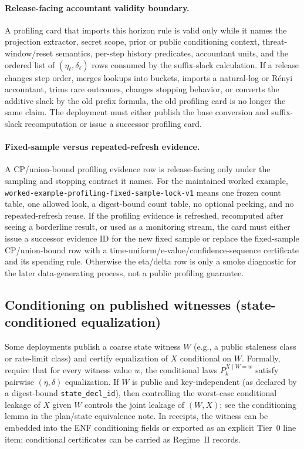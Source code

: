 \documentclass[11pt]{article}
\begin{document}
\paragraph{Release-facing accountant validity boundary.}
A profiling card that imports this horizon rule is valid only while it names the projection extractor, secret scope, prior or public conditioning context, threat-window/reset semantics, per-step history predicates, accountant units, and the ordered list of $(\eta_\ell,\delta_\ell)$ rows consumed by the suffix-slack calculation.
If a release changes step order, merges lookups into buckets, imports a natural-log or R\'enyi accountant, trims rare outcomes, changes stopping behavior, or converts the additive slack by the old prefix formula, the old profiling card is no longer the same claim.
The deployment must either publish the base conversion and suffix-slack recomputation or issue a successor profiling card.

\paragraph{Fixed-sample versus repeated-refresh evidence.}
A CP/union-bound profiling evidence row is release-facing only under the sampling and stopping contract it names.
For the maintained worked example, \texttt{worked-example-profiling-fixed-sample-lock-v1} means one frozen count table, one allowed look, a digest-bound count table, no optional peeking, and no repeated-refresh reuse.
If the profiling evidence is refreshed, recomputed after seeing a borderline result, or used as a monitoring stream, the card must either issue a successor evidence ID for the new fixed sample or replace the fixed-sample CP/union-bound row with a time-uniform/e-value/confidence-sequence certificate and its spending rule.
Otherwise the eta/delta row is only a smoke diagnostic for the later data-generating process, not a public profiling guarantee.

\subsection{Conditioning on published witnesses (state-conditioned equalization)}
Some deployments publish a coarse state witness $W$ (e.g., a public staleness class or rate-limit class) and certify equalization of $X$ conditional on $W$.
Formally, require that for every witness value $w$, the conditional laws $P_k^{X\mid W=w}$ satisfy pairwise $(\eta,\delta)$ equalization.
If $W$ is public and key-independent (as declared by a digest-bound \texttt{state\_decl\_id}), then controlling the worst-case conditional leakage of $X$ given $W$ controls the joint leakage of $(W,X)$; see the conditioning lemma in the plan/state equivalence note.\cite{series:planstateequiv}
In receipts, the witness can be embedded into the ENF conditioning fields or exported as an explicit Tier~0 line item; conditional certificates can be carried as Regime~II records.\cite{series:condcert}
\end{document}
